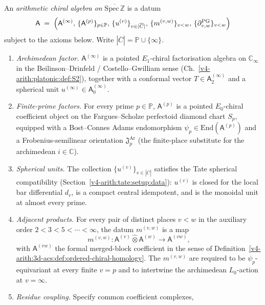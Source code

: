 \begin{definition}
\label{v4-arith:w9-r5:def:ArChAlg-object}
An \emph{arithmetic chiral algebra on} \(\overline{\mathrm{Spec}\,\mathbb{Z}}\)
is a datum
\begin{equation}
\label{v4-arith:w9-r5:eq:ArChAlg-object}
\mathsf{A}
\;=\;
\Bigl(\mathsf{A}^{(\infty)},\,\{\mathsf{A}^{(p)}\}_{p\in\mathbb{P}},\,
\{u^{(v)}\}_{v\in|\overline{C}|},\,\{m^{(v,w)}\}_{v<w},\,
\{\partial^{\mathrm{PG}}_{v,w}\}_{v<w}\Bigr)
\end{equation}
subject to the axioms below. Write \(|\overline{C}|=\mathbb{P}\cup\{\infty\}\).
\begin{enumerate}
\item \emph{Archimedean factor.} \(\mathsf{A}^{(\infty)}\) is a
pointed \(E_{1}\)-chiral factorisation algebra on \(\mathbb{C}_{\infty}\)
in the Beilinson--Drinfeld / Costello--Gwilliam sense
(Ch.~\ref{v4-arith:platonic:def:S2}), together with a conformal vector
\(T\in\mathsf{A}^{(\infty)}_{2}\) and a spherical unit
\(u^{(\infty)}\in\mathsf{A}^{(\infty)}_{0}\).
\item \emph{Finite-prime factors.} For every prime \(p\in\mathbb{P}\),
\(\mathsf{A}^{(p)}\) is a pointed \(E_{0}\)-chiral coefficient object on
the Fargues--Scholze perfectoid diamond chart \(S_{p}\), equipped with
a Bost--Connes Adams endomorphism \(\psi_{p}\in\mathrm{End}(\mathsf{A}^{(p)})\)
and a Frobenius-semilinear orientation
\(\mathfrak{J}^{\mathrm{Ar}}_{p}\) (the finite-place substitute for the
archimedean \(i\in\mathbb{C}\)).
\item \emph{Spherical units.} The collection \(\{u^{(v)}\}_{v\in|\overline{C}|}\)
satisfies the Tate spherical compatibility
(Section~\ref{v4-arith:tate:setup:data}): \(u^{(v)}\) is closed for the local
bar differential \(d_{v}\), is a compact central idempotent, and is
the monoidal unit at almost every prime.
\item \emph{Adjacent products.} For every pair of distinct places
\(v<w\) in the auxiliary order \(2<3<5<\cdots<\infty\), the datum \(m^{(v,w)}\)
is a map
\[
m^{(v,w)}\colon\mathsf{A}^{(v)}\widehat{\otimes}\mathsf{A}^{(w)}
\longrightarrow\mathsf{A}^{(vw)},
\]
with \(\mathsf{A}^{(vw)}\) the formal merged-block coefficient in the
sense of Definition~\ref{v4-arith:3d-acs:def:ordered-chiral-homology}. The
\(m^{(v,w)}\) are required to be \(\psi_{p}\)-equivariant at every finite
\(v=p\) and to intertwine the archimedean \(L_{0}\)-action at \(v=\infty\).
\item \emph{Residue coupling.} Specify common coefficient complexes,

\end{enumerate}
\end{definition}
